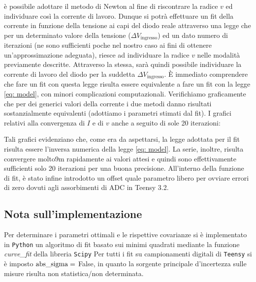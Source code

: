 \documentclass{article}[a4paper, oneside, 11pt]
\begin{document}
è possibile adottare il metodo di Newton al fine di riscontrare la radice $v$
ed individuare così la corrente di lavoro. 
Dunque si potrà effettuare un fit della corrente in funzione della tensione ai 
capi del diodo reale attraverso una legge che per un determinato valore della 
tensione ($\Delta V_{\text{ingresso}}$) ed un dato numero di iterazioni (ne 
sono sufficienti poche nel nostro caso ai fini di ottenere un’approssimazione 
adeguata), riesce ad individuare la radice $v$ nelle modalità previamente 
descritte. Attraverso la stessa, sarà quindi possibile individuare la corrente 
di lavoro del diodo per la suddetta $\Delta V_{\text{ingresso}}$. 
\`E immediato comprendere che fare un fit con questa legge risulta essere 
equivalente a fare un fit con la legge \eqref{eq: model}, con minori complicazioni 
computazionali. Verifichiamo graficamente che per dei generici valori della 
corrente i due metodi danno risultati sostanzialmente equivalenti (adottiamo i 
parametri stimati dal fit). I grafici relativi alla convergenza di $I$ e di $v$ 
anche a seguito di sole 20 iterazioni:
\begin{figure}[H]
	\centering 
	\def\svgwidth{\columnwidth}
		\scalebox{0.75}{}
\end{figure}
\begin{figure}[H]
	\centering 
		\scalebox{0.75}{}
\end{figure}
Tali grafici evidenziano che, come era da aspettarsi, la legge adottata per il 
fit risulta essere l’inversa numerica della legge \eqref{eq: model}. La serie,
inoltre, risulta convergere molto9m rapidamente ai valori attesi e quindi sono 
effettivamente sufficienti solo 20 iterazioni per una buona precisione.
All’interno della funzione di fit, è stato infine introdotto un offset quale
parametro libero per ovviare errori di zero dovuti agli assorbimenti di ADC
in Teensy 3.2.

\subsection*{Nota sull'implementazione}
Per determinare i parametri ottimali e le rispettive covarianze si \`e
implementato in \verb+Python+ un algoritmo di fit basato sui minimi quadrati
mediante la funzione \emph{curve\_fit} della libreria \texttt{Scipy}\cite{scipy}
Per tutti i fit su campionamenti digitali di \verb+Teensy+ si è imposto
$\rm{abs\_sigma} =$ False, in quanto la sorgente principale d'incertezza
sulle misure risulta non statistica/non determinata.

\medskip


\end{document}
